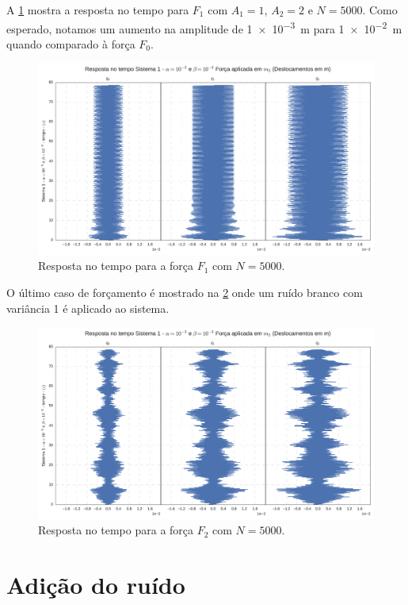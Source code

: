 A \cref{fig:F1_5000_tempo} mostra a resposta no tempo para $F_1$ com $ A_1 = 1 $, $ A_2 = 2  $ e $ N=5000 $. Como esperado, notamos um aumento na amplitude de \SI{1e-3}{\m} para \SI{1e-2}{\m} quando comparado à força $ F_0 $.

\begin{figure}
	\centering
	\includegraphics[scale=0.6]{IMGS/F1_5000_tempo.pdf}
	\caption{Resposta no tempo para a força $F_1$ com $N=5000$.}
	\label{fig:F1_5000_tempo}
\end{figure}

O último caso de forçamento é mostrado na \cref{fig:F2_5000_tempo} onde um ruído branco com variância 1 é aplicado ao sistema.

\begin{figure}
	\centering
	\includegraphics[scale=0.6]{IMGS/F2_5000_tempo.pdf}
	\caption{Resposta no tempo para a força $F_2$ com $N=5000$.}
	\label{fig:F2_5000_tempo}
\end{figure}

\section{Adição do ruído}

